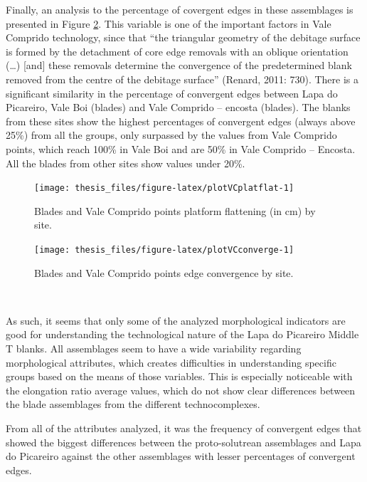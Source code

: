 \documentclass[12pt,twoside]{reedthesis}
\begin{document}
Finally, an analysis to the percentage of covergent edges in these assemblages is presented in Figure \ref{fig:plotVCconverge}. This variable is one of the important factors in Vale Comprido technology, since that ``the triangular geometry of the debitage surface is formed by the detachment of core edge removals
with an oblique orientation (\ldots) {[}and{]} these removals determine the convergence of the predetermined blank removed from the centre of the debitage surface'' (Renard, 2011: 730). There is a significant similarity in the percentage of convergent edges between Lapa do Picareiro, Vale Boi (blades) and Vale Comprido -- encosta (blades). The blanks from these sites show the highest percentages of convergent edges (always above 25\%) from all the groups, only surpassed by the values from Vale Comprido points, which reach 100\% in Vale Boi and are 50\% in Vale Comprido -- Encosta. All the blades from other sites show values under 20\%.
\begin{figure}

{\centering \texttt{[image: thesis\_files/figure-latex/plotVCplatflat-1]} 

}

\caption{Blades and Vale Comprido points platform flattening (in cm) by site.}\label{fig:plotVCplatflat}
\end{figure}
\begin{figure}

{\centering \texttt{[image: thesis\_files/figure-latex/plotVCconverge-1]} 

}

\caption{Blades and Vale Comprido points edge convergence by site.}\label{fig:plotVCconverge}
\end{figure}
~

As such, it seems that only some of the analyzed morphological indicators are good for understanding the technological nature of the Lapa do Picareiro Middle T blanks. All assemblages seem to have a wide variability regarding morphological attributes, which creates difficulties in understanding specific groups based on the means of those variables. This is especially noticeable with the elongation ratio average values, which do not show clear differences between the blade assemblages from the different technocomplexes.

From all of the attributes analyzed, it was the frequency of convergent edges that showed the biggest differences between the proto-solutrean assemblages and Lapa do Picareiro against the other assemblages with lesser percentages of convergent edges.
\end{document}
